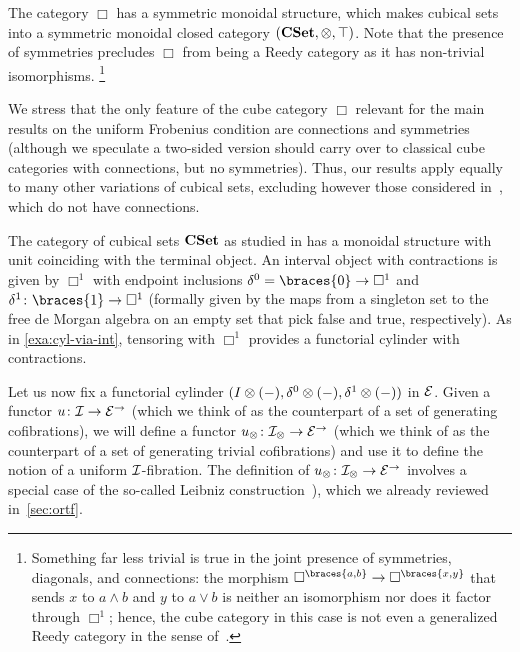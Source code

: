 \documentclass[reqno,10pt,a4paper,oneside,draft]{amsart}
\begin{document}
\begin{example} \label{exa:cyl-in-cuset}

The category $\Box$ has a symmetric monoidal structure, which makes cubical sets into a symmetric monoidal closed category $(\CSet, \otimes, \top)$.
Note that the presence of symmetries precludes $\Box$ from being a Reedy category as it has non-trivial isomorphisms.%
\footnote{
Something far less trivial is true in the joint presence of symmetries, diagonals, and connections: the morphism $\Box^{\braces{a, b}} \to \Box^{\braces{x, y}}$ that sends $x$ to $a \wedge b$ and $y$ to $a \vee b$ is neither an isomorphism nor does it factor through $\Box^1$; hence, the cube category in this case is not even a generalized Reedy category in the sense of~\cite{berger-moerdijk:generalized-reedy}.
}

We stress that the only feature of the cube category $\Box$ relevant for the main
results on the uniform Frobenius condition are connections and symmetries (although we speculate a two-sided version should carry over to classical cube categories with connections, but no symmetries).
Thus, our results apply equally to many other variations of cubical sets, excluding however 
those considered in~\cite{coquand-cubical-sets,huber-thesis}, which do not have connections.

The category of cubical sets $\CSet$ as studied in \cite{cohen-et-al:cubicaltt} has a monoidal structure with unit coinciding with the terminal object.
An interval object with contractions is given by $\Box^1$ with endpoint inclusions $\lcyl = \braces{0} \to \Box^1$ and $\rcyl \co \braces{1} \to \Box^1$ (formally given by the maps from a singleton set to the free de Morgan algebra on an empty set that pick false and true, respectively).
As in \cref{exa:cyl-via-int}, tensoring with $\Box^1$ provides a functorial cylinder with contractions.
\end{example}




Let us now fix a functorial cylinder $(\interval \otimes (-), \lcyl \otimes (-), \rcyl \otimes (-))$ in $\calE$.
Given a functor $u \co \cal{I} \to \catE^\to$ (which we think of as the counterpart of a set of generating cofibrations), we will define a functor $u_\otimes \co \cal{I}_\otimes \to \catE^\to$ (which we think of as the counterpart of a set of generating trivial cofibrations) and use it to define the notion of a uniform $\cal{I}$-fibration.
The definition of $u_\otimes \co \cal{I}_\otimes \to \catE^\to$ involves a special case of the so-called Leibniz construction~\cite{riehl-verity:reedy}), which we already reviewed 
in~\cref{sec:ortf}.
\end{document}
